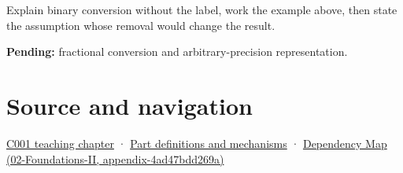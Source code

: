 Explain binary conversion without the label, work the example above, then state the assumption whose removal would change the result.

\textbf{Pending:} fractional conversion and arbitrary-precision representation.

\section{Source and navigation}\label{appendix-dc552784a2c0-source-and-navigation}

\href{Continuous\%20Notes/Computing\%20Foundations\%20-\%20From\%20Bits\%20to\%20C++\%20and\%20Systems\%20APIs\#From\%20a\%20signal\%20to\%20an\%20interpretation}{C001 teaching chapter} · \hyperref[appendix-fd090d982a15]{Part definitions and mechanisms} · \href{../02-Foundations-II/main.pdf\#nameddest=appendix-4ad47bdd269a}{Dependency Map (02-Foundations-II, appendix-4ad47bdd269a)}
